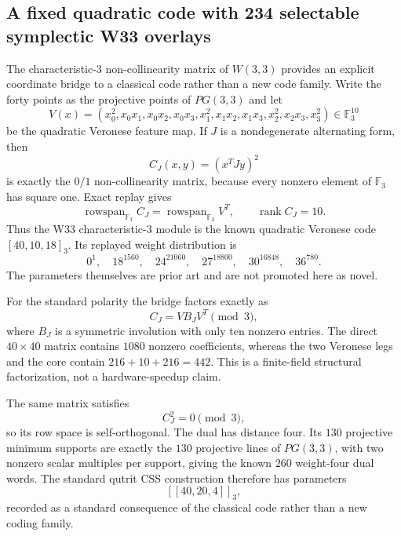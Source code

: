 \subsection{A fixed quadratic code with 234 selectable symplectic W33 overlays}
\label{sec:pass5744-5751-quadratic-overlays}

The characteristic-$3$ non-collinearity matrix of $W(3,3)$ provides an explicit
coordinate bridge to a classical code rather than a new code family.  Write the forty
points as the projective points of $PG(3,3)$ and let
\[
V(x)=(x_0^2,x_0x_1,x_0x_2,x_0x_3,x_1^2,x_1x_2,x_1x_3,x_2^2,x_2x_3,x_3^2)
\in\mathbb F_3^{10}
\]
be the quadratic Veronese feature map.  If $J$ is a nondegenerate alternating form,
then
\[
C_J(x,y)=(x^{T}Jy)^2
\]
is exactly the $0/1$ non-collinearity matrix, because every nonzero element of
$\mathbb F_3$ has square one.  Exact replay gives
\[
\operatorname{rowspan}_{\mathbb F_3} C_J
 =\operatorname{rowspan}_{\mathbb F_3} V^T,
\qquad \operatorname{rank}C_J=10.
\]
Thus the W33 characteristic-$3$ module is the known quadratic Veronese code
$[40,10,18]_3$.  Its replayed weight distribution is
\[
0^1,\quad18^{1560},\quad24^{21060},\quad27^{18800},\quad30^{16848},\quad36^{780}.
\]
The parameters themselves are prior art and are not promoted here as novel.

For the standard polarity the bridge factors exactly as
\[
\boxed{C_J=VB_JV^T\pmod3},
\]
where $B_J$ is a symmetric involution with only ten nonzero entries.  The direct
$40\times40$ matrix contains $1080$ nonzero coefficients, whereas the two Veronese
legs and the core contain $216+10+216=442$.  This is a finite-field structural
factorization, not a hardware-speedup claim.

The same matrix satisfies
\[
\boxed{C_J^2=0\pmod3},
\]
so its row space is self-orthogonal.  The dual has distance four.  Its $130$
projective minimum supports are exactly the $130$ projective lines of $PG(3,3)$,
with two nonzero scalar multiples per support, giving the known $260$ weight-four
dual words.  The standard qutrit CSS construction therefore has parameters
\[
\boxed{[[40,20,4]]_3},
\]
recorded as a standard consequence of the classical code rather than a new coding
family.


